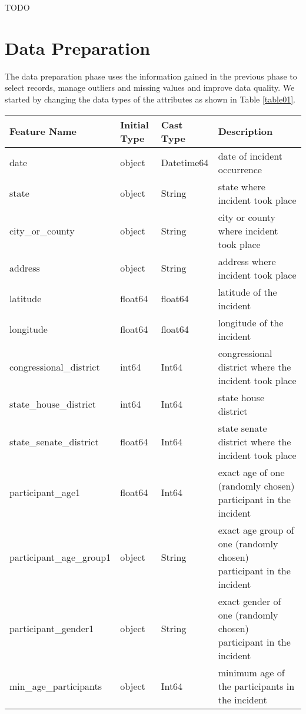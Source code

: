 \documentclass[10pt,a4paper]{report}
\begin{document}
TODO

\chapter{Data Preparation}

The data preparation phase uses the information gained in the previous phase to select records, manage outliers and missing values and improve data quality.
We started by changing the data types of the attributes as shown in Table \ref{table01}.

\begin{table}
	\centering
	\begin{small}
	\begin{tabular}{|l|l|l|p{7cm}|}
		\hline
		\textbf{Feature Name} & \textbf{Initial Type} & \textbf{Cast Type} & \textbf{Description}\\
		\hline
		date & object & Datetime64 & date of incident occurrence\\
		\hline
		state & object & String & state where incident took place\\
		\hline
		city\_or\_county & object & String & city or county where incident took place\\
		\hline
		address & object & String & address where incident took place\\
		\hline
		latitude & float64 & float64 & latitude of the incident\\
		\hline
		longitude & float64 & float64 & longitude of the incident\\
		\hline
		congressional\_district & int64 & Int64 & congressional district where the incident took place\\
		\hline
		state\_house\_district & int64 & Int64 & state house district\\
		\hline
		state\_senate\_district & float64 & Int64 & state senate district where the incident took place\\
		\hline
		participant\_age1 & float64 & Int64 & exact age of one (randomly chosen) participant in the incident\\
		\hline
		participant\_age\_group1 & object & String & exact age group of one (randomly chosen) participant in the incident\\
		\hline
		participant\_gender1 & object & String & exact gender of one (randomly chosen) participant in the incident\\
		\hline
		min\_age\_participants & object & Int64 & minimum age of the participants in the incident\\

\end{tabular}
\end{small}
\end{table}
\end{document}
